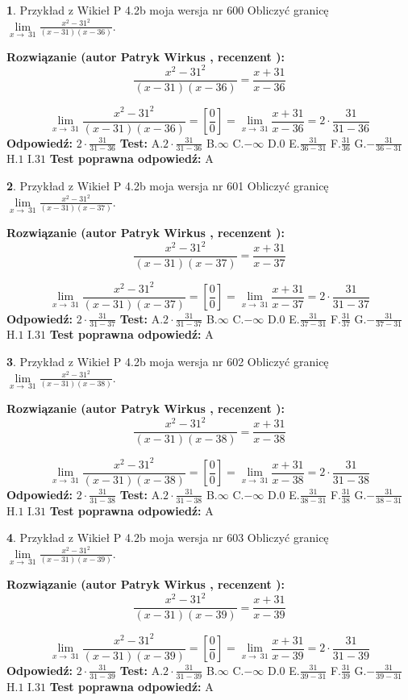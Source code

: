 \documentclass[12pt, a4paper]{article}
\theoremstyle{definition} %
\newtheorem{zad}{}
\newcommand{\zadStart}[1]{\begin{zad}#1\newline}
\newcommand{\zadStop}{\end{zad}}
\newcommand{\rozwStart}[2]{\noindent \textbf{Rozwiązanie (autor #1 , recenzent #2): }\newline}
\newcommand{\rozwStop}{\newline}
\newcommand{\odpStart}{\noindent \textbf{Odpowiedź:}\newline}
\newcommand{\odpStop}{\newline}
\newcommand{\testStart}{\noindent \textbf{Test:}\newline}
\newcommand{\testStop}{\newline}
\newcommand{\kluczStart}{\noindent \textbf{Test poprawna odpowiedź:}\newline}
\newcommand{\kluczStop}{\newline}
\begin{document}
\zadStart{Przykład z Wikieł P 4.2b moja wersja nr 600}
Obliczyć granicę $\lim\limits_{x\to\ 31}\frac{x^{2}-31^{2}}{(x-31)(x-36)}$.
\zadStop
\rozwStart{Patryk Wirkus}{}
$$\frac{x^{2}-31^{2}}{(x-31)(x-36)}=\frac{x+31}{x-36}$$

$$\lim\limits_{x\to\ 31}\frac{x^{2}-31^{2}}{(x-31)(x-36)}=[\frac{0}{0}]=\lim\limits_{x\to\ 31}\frac{x+31}{x-36}=2 \cdot \frac{31}{31-36}$$
\rozwStop
\odpStart
$2 \cdot \frac{31}{31-36}$
\odpStop
\testStart
A.$2 \cdot \frac{31}{31-36}$
B.$\infty$
C.$-\infty$
D.$0$
E.$\frac{31}{36-31}$
F.$\frac{31}{36}$
G.$-\frac{31}{36-31}$
H.$1$
I.$31$
\testStop
\kluczStart
A
\kluczStop



\zadStart{Przykład z Wikieł P 4.2b moja wersja nr 601}
Obliczyć granicę $\lim\limits_{x\to\ 31}\frac{x^{2}-31^{2}}{(x-31)(x-37)}$.
\zadStop
\rozwStart{Patryk Wirkus}{}
$$\frac{x^{2}-31^{2}}{(x-31)(x-37)}=\frac{x+31}{x-37}$$

$$\lim\limits_{x\to\ 31}\frac{x^{2}-31^{2}}{(x-31)(x-37)}=[\frac{0}{0}]=\lim\limits_{x\to\ 31}\frac{x+31}{x-37}=2 \cdot \frac{31}{31-37}$$
\rozwStop
\odpStart
$2 \cdot \frac{31}{31-37}$
\odpStop
\testStart
A.$2 \cdot \frac{31}{31-37}$
B.$\infty$
C.$-\infty$
D.$0$
E.$\frac{31}{37-31}$
F.$\frac{31}{37}$
G.$-\frac{31}{37-31}$
H.$1$
I.$31$
\testStop
\kluczStart
A
\kluczStop



\zadStart{Przykład z Wikieł P 4.2b moja wersja nr 602}
Obliczyć granicę $\lim\limits_{x\to\ 31}\frac{x^{2}-31^{2}}{(x-31)(x-38)}$.
\zadStop
\rozwStart{Patryk Wirkus}{}
$$\frac{x^{2}-31^{2}}{(x-31)(x-38)}=\frac{x+31}{x-38}$$

$$\lim\limits_{x\to\ 31}\frac{x^{2}-31^{2}}{(x-31)(x-38)}=[\frac{0}{0}]=\lim\limits_{x\to\ 31}\frac{x+31}{x-38}=2 \cdot \frac{31}{31-38}$$
\rozwStop
\odpStart
$2 \cdot \frac{31}{31-38}$
\odpStop
\testStart
A.$2 \cdot \frac{31}{31-38}$
B.$\infty$
C.$-\infty$
D.$0$
E.$\frac{31}{38-31}$
F.$\frac{31}{38}$
G.$-\frac{31}{38-31}$
H.$1$
I.$31$
\testStop
\kluczStart
A
\kluczStop



\zadStart{Przykład z Wikieł P 4.2b moja wersja nr 603}
Obliczyć granicę $\lim\limits_{x\to\ 31}\frac{x^{2}-31^{2}}{(x-31)(x-39)}$.
\zadStop
\rozwStart{Patryk Wirkus}{}
$$\frac{x^{2}-31^{2}}{(x-31)(x-39)}=\frac{x+31}{x-39}$$

$$\lim\limits_{x\to\ 31}\frac{x^{2}-31^{2}}{(x-31)(x-39)}=[\frac{0}{0}]=\lim\limits_{x\to\ 31}\frac{x+31}{x-39}=2 \cdot \frac{31}{31-39}$$
\rozwStop
\odpStart
$2 \cdot \frac{31}{31-39}$
\odpStop
\testStart
A.$2 \cdot \frac{31}{31-39}$
B.$\infty$
C.$-\infty$
D.$0$
E.$\frac{31}{39-31}$
F.$\frac{31}{39}$
G.$-\frac{31}{39-31}$
H.$1$
I.$31$
\testStop
\kluczStart
A
\kluczStop
\end{document}
